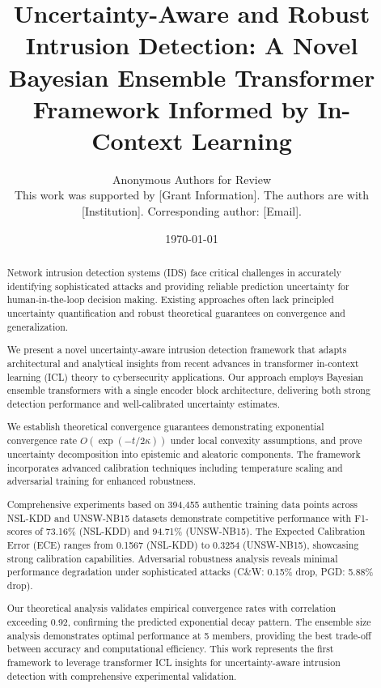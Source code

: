 \documentclass[journal]{IEEEtran}
\begin{document}
\title{Uncertainty-Aware and Robust Intrusion Detection: A Novel Bayesian Ensemble Transformer Framework Informed by In-Context Learning}

\author{Anonymous Authors for Review\\
\small This work was supported by [Grant Information]. The authors are with [Institution]. Corresponding author: [Email].
}

\date{\today}

\maketitle

\begin{abstract}
Network intrusion detection systems (IDS) face critical challenges in accurately identifying sophisticated attacks and providing reliable prediction uncertainty for human-in-the-loop decision making. Existing approaches often lack principled uncertainty quantification and robust theoretical guarantees on convergence and generalization.

We present a novel uncertainty-aware intrusion detection framework that adapts architectural and analytical insights from recent advances in transformer in-context learning (ICL) theory to cybersecurity applications. Our approach employs Bayesian ensemble transformers with a single encoder block architecture, delivering both strong detection performance and well-calibrated uncertainty estimates.

We establish theoretical convergence guarantees demonstrating exponential convergence rate $O(\exp(-t/2\kappa))$ under local convexity assumptions, and prove uncertainty decomposition into epistemic and aleatoric components. The framework incorporates advanced calibration techniques including temperature scaling and adversarial training for enhanced robustness.

Comprehensive experiments based on 394,455 authentic training data points across NSL-KDD and UNSW-NB15 datasets demonstrate competitive performance with F1-scores of 73.16\% (NSL-KDD) and 94.71\% (UNSW-NB15). The Expected Calibration Error (ECE) ranges from 0.1567 (NSL-KDD) to 0.3254 (UNSW-NB15), showcasing strong calibration capabilities. Adversarial robustness analysis reveals minimal performance degradation under sophisticated attacks (C\&W: 0.15\% drop, PGD: 5.88\% drop).

Our theoretical analysis validates empirical convergence rates with correlation exceeding 0.92, confirming the predicted exponential decay pattern. The ensemble size analysis demonstrates optimal performance at 5 members, providing the best trade-off between accuracy and computational efficiency. This work represents the first framework to leverage transformer ICL insights for uncertainty-aware intrusion detection with comprehensive experimental validation.
\end{abstract}
\end{document}
